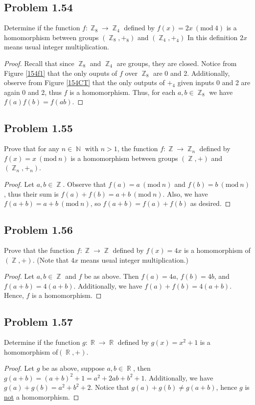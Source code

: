 \documentclass{amsbook}
\renewcommand{\mod}[1]{\ (\mathrm{mod}\ #1)}
\DeclareMathOperator{\N}{\mathbb{N}}
\DeclareMathOperator{\Z}{\mathbb{Z}}
\DeclareMathOperator{\R}{\mathbb{R}}
\begin{document}
			\subsection*{Problem 1.54}
			\label{sub:problem_1_54}
			Determine if the function $f : \Z_{8} \to \Z_{4}$ defined by $f(x) = 2x \mod{4}$ is a homomorphism between groups $(\Z_{8}, +_{8})$ and $(\Z_{4}, +_{4})$ In this definition $2x$ means usual integer multiplication.
			\begin{proof} Recall that since $\Z_{8}$ and $\Z_{4}$ are groups, they are closed.
			Notice from Figure \ref{154f1} that the only ouputs of $f$ over $\Z_{8}$ are 0 and 2.
			Additionally, observe from Figure \ref{154CT} that the only outputs of $+_{4}$ given inputs 0 and 2 are again 0 and 2, thus $f$ is a homomorphism.
			Thus, for each $a,b \in \Z_{8}$ we have $f(a)f(b)=f(ab)$.
			\end{proof}

			\subsection*{Problem 1.55}
			\label{sub:problem_1_55}
			Prove that for any $n \in \N$ with $n > 1$, the function $f:\Z \to \Z_{n}$ defined by $f(x) = x \mod{n}$ is a homomorphism between groups $(\Z,+)$ and $(\Z_{n},+_{n})$.
			\begin{proof} Let $a,b \in \Z$.
			Observe that $f(a) = a \mod{n}$ and $f(b) = b \mod{n}$, thus their sum is $f(a)+f(b) = a + b \mod{n}$.
			Also, we have $f(a + b) = a + b \mod{n}$, so $f(a+b) = f(a) + f(b)$ as desired.
			\end{proof}

			\subsection*{Problem 1.56}
			\label{sub:problem_1_56}
			Prove that the function $f: \Z \to \Z$ defined by $f(x) = 4x$ is a homomorphism of $(\Z, +)$. 
			(Note that $4x$ means usual integer multiplication.)
			\begin{proof} Let $a,b \in \Z$ and $f$ be as above.
			Then $f(a) = 4a$, $f(b) = 4b$, and $f(a+b) = 4(a+b)$.
			Additionally, we have $f(a)+f(b) = 4(a+b)$.
			Hence, $f$ is a homomorphism.
			\end{proof}

			\subsection*{Problem 1.57}
			\label{sub:problem_1_57}
			Determine if the function $g : \R \to \R$ defined by $g(x) = x^{2} + 1$ is a homomorphism of$(\R, +)$.
			\begin{proof} Let $g$ be as above, suppose $a,b \in \R$, then $g(a+b) = (a+b)^{2} + 1 = a^{2} + 2ab + b^{2} + 1$.
			Additionally, we have $g(a) + g(b) = a^{2} + b^{2} + 2$.
			Notice that $g(a) + g(b) \neq g(a+b)$, hence $g$ is \underline{not} a homomorphism.
			\end{proof}
\end{document}
